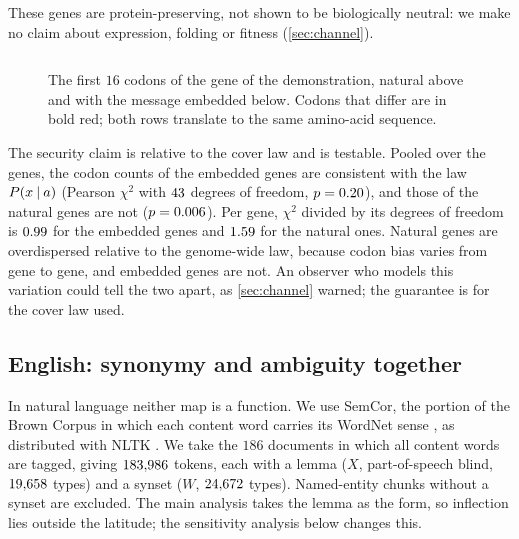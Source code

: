 These genes are protein-preserving, not shown to be biologically neutral: we make no claim about expression, folding or fitness (\cref{sec:channel}).
\begin{table}[tbp]
\caption{Embedding a hidden message in the synonymous choices of real \emph{E.\,coli} genes. Capacity is $\sum_iH(X\given a_i)/n$, the exact expected number of bits per codon; the rate is the payload actually used.}\label{tab:embed}
\centering\small

\end{table}

\begin{figure}[tbp]
\centering\footnotesize
\begin{tabular}{@{}l@{}}

\end{tabular}
\caption{The first $16$ codons of the gene of the demonstration, natural above and with the message embedded below. Codons that differ are in bold red; both rows translate to the same amino-acid sequence.}\label{fig:showcase}
\end{figure}
The security claim is relative to the cover law and is testable. Pooled over the \EmbGenes{} genes, the codon counts of the embedded genes are consistent with the law $P(x\mathbin{\vert} a)$ (Pearson $\chi^2$ with $43$ degrees of freedom, $p=0.20$), and those of the natural genes are not ($p=0.006$). Per gene, $\chi^2$ divided by its degrees of freedom is $0.99$ for the embedded genes and $1.59$ for the natural ones. Natural genes are overdispersed relative to the genome-wide law, because codon bias varies from gene to gene, and embedded genes are not. An observer who models this variation could tell the two apart, as \cref{sec:channel} warned; the guarantee is for the cover law used.

\subsection{English: synonymy and ambiguity together}\label{sec:semcor}
In natural language neither map is a function. We use SemCor, the portion of the Brown Corpus in which each content word carries its WordNet sense \citep{miller1993,miller1995,fellbaum1998}, as distributed with NLTK \citep{bird2009}. We take the $186$ documents in which all content words are tagged, giving $183{,}986$ tokens, each with a lemma ($X$, part-of-speech blind, $19{,}658$ types) and a synset ($W$, $24{,}672$ types). Named-entity chunks without a synset are excluded. The main analysis takes the lemma as the form, so inflection lies outside the latitude; the sensitivity analysis below changes this.

